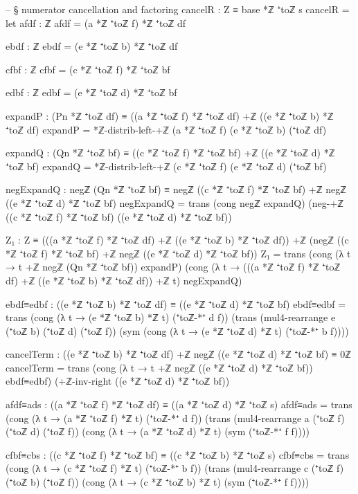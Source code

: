 \documentclass[11pt,a4paper]{book}
\begin{document}
\begin{code}
    -- § numerator cancellation and factoring
    cancelR : Z ≡ base *ℤ ⁺toℤ s
    cancelR =
      let
        afdf : ℤ
        afdf = (a *ℤ ⁺toℤ f) *ℤ ⁺toℤ df

        ebdf : ℤ
        ebdf = (e *ℤ ⁺toℤ b) *ℤ ⁺toℤ df

        cfbf : ℤ
        cfbf = (c *ℤ ⁺toℤ f) *ℤ ⁺toℤ bf

        edbf : ℤ
        edbf = (e *ℤ ⁺toℤ d) *ℤ ⁺toℤ bf

        expandP : (Pn *ℤ ⁺toℤ df) ≡ ((a *ℤ ⁺toℤ f) *ℤ ⁺toℤ df) +ℤ ((e *ℤ ⁺toℤ b) *ℤ ⁺toℤ df)
        expandP = *ℤ-distrib-left-+ℤ (a *ℤ ⁺toℤ f) (e *ℤ ⁺toℤ b) (⁺toℤ df)

        expandQ : (Qn *ℤ ⁺toℤ bf) ≡ ((c *ℤ ⁺toℤ f) *ℤ ⁺toℤ bf) +ℤ ((e *ℤ ⁺toℤ d) *ℤ ⁺toℤ bf)
        expandQ = *ℤ-distrib-left-+ℤ (c *ℤ ⁺toℤ f) (e *ℤ ⁺toℤ d) (⁺toℤ bf)

        negExpandQ : negℤ (Qn *ℤ ⁺toℤ bf) ≡ negℤ ((c *ℤ ⁺toℤ f) *ℤ ⁺toℤ bf) +ℤ negℤ ((e *ℤ ⁺toℤ d) *ℤ ⁺toℤ bf)
        negExpandQ = trans (cong negℤ expandQ) (neg-+ℤ ((c *ℤ ⁺toℤ f) *ℤ ⁺toℤ bf) ((e *ℤ ⁺toℤ d) *ℤ ⁺toℤ bf))

        Z₁ : Z ≡ (((a *ℤ ⁺toℤ f) *ℤ ⁺toℤ df) +ℤ ((e *ℤ ⁺toℤ b) *ℤ ⁺toℤ df))
                 +ℤ (negℤ ((c *ℤ ⁺toℤ f) *ℤ ⁺toℤ bf) +ℤ negℤ ((e *ℤ ⁺toℤ d) *ℤ ⁺toℤ bf))
        Z₁ =
          trans
            (cong (λ t → t +ℤ negℤ (Qn *ℤ ⁺toℤ bf)) expandP)
            (cong (λ t → (((a *ℤ ⁺toℤ f) *ℤ ⁺toℤ df) +ℤ ((e *ℤ ⁺toℤ b) *ℤ ⁺toℤ df)) +ℤ t) negExpandQ)

        ebdf≡edbf : ((e *ℤ ⁺toℤ b) *ℤ ⁺toℤ df) ≡ ((e *ℤ ⁺toℤ d) *ℤ ⁺toℤ bf)
        ebdf≡edbf =
          trans
            (cong (λ t → (e *ℤ ⁺toℤ b) *ℤ t) (⁺toℤ-*⁺ d f))
            (trans
              (mul4-rearrange e (⁺toℤ b) (⁺toℤ d) (⁺toℤ f))
              (sym (cong (λ t → (e *ℤ ⁺toℤ d) *ℤ t) (⁺toℤ-*⁺ b f))))

        cancelTerm : ((e *ℤ ⁺toℤ b) *ℤ ⁺toℤ df) +ℤ negℤ ((e *ℤ ⁺toℤ d) *ℤ ⁺toℤ bf) ≡ 0ℤ
        cancelTerm = trans (cong (λ t → t +ℤ negℤ ((e *ℤ ⁺toℤ d) *ℤ ⁺toℤ bf)) ebdf≡edbf) (+ℤ-inv-right ((e *ℤ ⁺toℤ d) *ℤ ⁺toℤ bf))

        afdf≡ads : ((a *ℤ ⁺toℤ f) *ℤ ⁺toℤ df) ≡ ((a *ℤ ⁺toℤ d) *ℤ ⁺toℤ s)
        afdf≡ads =
          trans
            (cong (λ t → (a *ℤ ⁺toℤ f) *ℤ t) (⁺toℤ-*⁺ d f))
            (trans
              (mul4-rearrange a (⁺toℤ f) (⁺toℤ d) (⁺toℤ f))
              (cong (λ t → (a *ℤ ⁺toℤ d) *ℤ t) (sym (⁺toℤ-*⁺ f f))))

        cfbf≡cbs : ((c *ℤ ⁺toℤ f) *ℤ ⁺toℤ bf) ≡ ((c *ℤ ⁺toℤ b) *ℤ ⁺toℤ s)
        cfbf≡cbs =
          trans
            (cong (λ t → (c *ℤ ⁺toℤ f) *ℤ t) (⁺toℤ-*⁺ b f))
            (trans
              (mul4-rearrange c (⁺toℤ f) (⁺toℤ b) (⁺toℤ f))
              (cong (λ t → (c *ℤ ⁺toℤ b) *ℤ t) (sym (⁺toℤ-*⁺ f f))))


\end{code}
\end{document}
